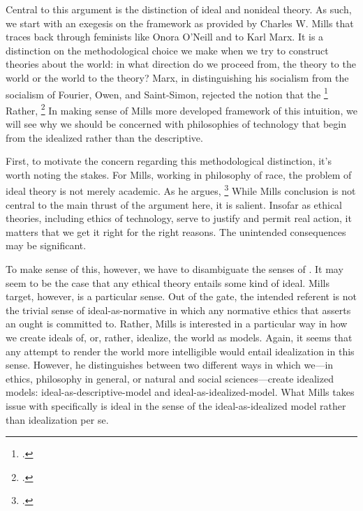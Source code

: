 \documentclass[letterpaper,notitlepage,12pt]{article}
\begin{document}
Central to this argument is the distinction of ideal and nonideal theory.
As such, we start with an exegesis on the framework as provided by Charles W.
Mills that traces back through feminists like Onora O'Neill and to Karl Marx.
It is a distinction on the methodological choice we make when we try to
construct theories about the world: in what direction do we proceed from, the 
theory to the world or the world to the theory?
Marx, in distinguishing his  socialism from the
 socialism of Fourier, Owen, and Saint-Simon, rejected the
notion that the \footcite{engels_socialism:_1978}
Rather, \footcite{marx_german_200}
In making sense of Mills more developed framework of this intuition, we will see
why we should be concerned with philosophies of technology that begin from the
idealized rather than the descriptive.

First, to motivate the concern regarding this methodological distinction, it's
worth noting the stakes.
For Mills, working in philosophy of race, the problem of ideal theory is
not merely academic.
As he argues, \footcite[p. 166]{mills_ideal_2005}
While Mills conclusion is not central to the main thrust of the argument here,
it is salient.
Insofar as ethical theories, including ethics of technology, serve to justify
and permit real action, it matters that we get it right for the right reasons.
The unintended consequences may be significant.

To make sense of this, however, we have to disambiguate the senses of
.
It may seem to be the case that any ethical theory entails some kind of ideal.
Mills target, however, is a particular sense.
Out of the gate, the intended referent is not the trivial sense of
ideal-as-normative in which any normative ethics that asserts an ought is
committed to.
Rather, Mills is interested in a particular way in how we create ideals of, or, 
rather, idealize, the world as models.
Again, it seems that any attempt to render the world more intelligible would
entail idealization in this sense.
However, he distinguishes between two different ways in which we---in ethics, 
philosophy in general, or natural and social sciences---create idealized models:
ideal-as-descriptive-model and ideal-as-idealized-model.
What Mills takes issue with specifically is ideal in the sense of the
ideal-as-idealized model rather than idealization per se.
\end{document}
